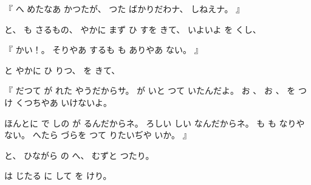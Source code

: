 %
『
へ
めたなあ
かつたが、
%
つた
ばかりだわナ、
%
しねえナ。%
』

%
と、
%
も
さるもの、
%
やかに
まず
ひ
すを
きて、
%
いよいよ%
を
くし、

%
『
かい！。
%
そりやあ
するも%
も
ありやあ
ない。
』

%
と
やかに
ひ
りつ、
%
を
きて、

%
『
だつて
が
れた
やうだからサ。
%
が
いと
つて
いたんだよ。
%
お
、
%
お
、
%
を
つけ
くつちやあ
いけないよ。

%
ほんとに
で
しの
が
るんだからネ。
%
ろしい
しい
なんだからネ。
%
も
も
なりや
ない。
%
へたら
づらを
つて
りたいぢや
いか。
』

%
と、
%
ひながら
の
へ、
%
むずと
つたり。

%
は
じたる
に
して
を
けり。
